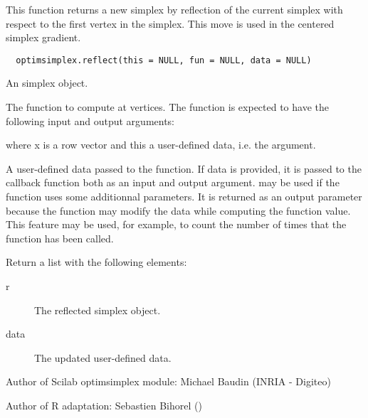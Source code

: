 %
\begin{Description}\relax
This function returns a new simplex by reflection of the current simplex with
respect to the first vertex in the simplex. This move is used in the centered
simplex gradient.
\end{Description}
%
\begin{Usage}
\begin{verbatim}
  optimsimplex.reflect(this = NULL, fun = NULL, data = NULL)
\end{verbatim}
\end{Usage}
%
\begin{Arguments}
\begin{ldescription}
\item[\code{this}] An simplex object.
\item[\code{fun}] The function to compute at vertices. The function is expected to
have the following input and output arguments:

where x is a row vector and this a user-defined data, i.e. the 
argument.
\item[\code{data}] A user-defined data passed to the function. If data is provided,
it is passed to the callback function both as an input and output argument.
 may be used if the function uses some additionnal parameters. It
is returned as an output parameter because the function may modify the data
while computing the function value. This feature may be used, for example,
to count the number of times that the function has been called.
\end{ldescription}
\end{Arguments}
%
\begin{Value}
Return a list with the following elements: \begin{description}

\item[r] The reflected simplex object.
\item[data] The updated user-defined data.

\end{description}

\end{Value}
%
\begin{Author}\relax
Author of Scilab optimsimplex module: Michael Baudin (INRIA - Digiteo)

Author of R adaptation: Sebastien Bihorel ()
\end{Author}
%
\begin{SeeAlso}\relax
{}
\end{SeeAlso}

